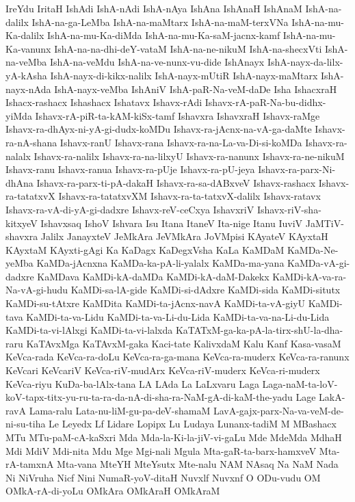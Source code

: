 {IreYdu
IritaH
IshAdi
IshA-nAdi
IshA-nAya
IshAna
IshAnaH
IshAnaM
IshA-na-dalilx
IshA-na-ga-LeMba
IshA-na-maMtarx
IshA-na-maM-terxVNa
IshA-na-mu-Ka-dalilx
IshA-na-mu-Ka-diMda
IshA-na-mu-Ka-saM-jacnx-kamf
IshA-na-mu-Ka-vanunx
IshA-na-na-dhi-deY-vataM
IshA-na-ne-nikuM
IshA-na-shecxVti
IshA-na-veMba
IshA-na-veMdu
IshA-na-ve-nunx-vu-dide
IshAnayx
IshA-nayx-da-lilx-yA-kAsha
IshA-nayx-di-kikx-nalilx
IshA-nayx-mUtiR
IshA-nayx-maMtarx
IshA-nayx-nAda
IshA-nayx-veMba
IshAniV
IshA-paR-Na-veM-daDe
Isha
IshacxraH
Ishacx-rashacx
Ishashacx
Ishatavx
Ishavx-rAdi
Ishavx-rA-paR-Na-bu-didhx-yiMda
Ishavx-rA-piR-ta-kAM-kiSx-tamf
Ishavxra
IshavxraH
Ishavx-raMge
Ishavx-ra-dhAyx-ni-yA-gi-dudx-koMDu
Ishavx-ra-jAcnx-na-vA-ga-daMte
Ishavx-ra-nA-shana
Ishavx-ranU
Ishavx-rana
Ishavx-ra-na-La-va-Di-si-koMDa
Ishavx-ra-nalalx
Ishavx-ra-nalilx
Ishavx-ra-na-lilxyU
Ishavx-ra-nanunx
Ishavx-ra-ne-nikuM
Ishavx-ranu
Ishavx-ranua
Ishavx-ra-pUje
Ishavx-ra-pU-jeya
Ishavx-ra-parx-Ni-dhAna
Ishavx-ra-parx-ti-pA-dakaH
Ishavx-ra-sa-dABxveV
Ishavx-rashacx
Ishavx-ra-tatatxvX
Ishavx-ra-tatatxvXM
Ishavx-ra-ta-tatxvX-dalilx
Ishavx-ratavx
Ishavx-ra-vA-di-yA-gi-dadxre
Ishavx-reV-ceCxya
IshavxriV
Ishavx-riV-sha-kitxyeV
Ishavxsaq
IshoV
Ishvara
Isu
Itana
ItaneV
Ita-nige
Itanu
IuviV
JaMTiV-shavxra
Jalilx
JanayxteV
JeMkAra
JeVMkAra
JoVMpisi
KAyateV
KAyxtaH
KAyxtaM
KAyxti-gAgi
Ka
KaDagx
KaDegxVsha
KaLa
KaMDaM
KaMDa-Ne-yeMba
KaMDa-jAcnxna
KaMDa-ka-pA-li-yalalx
KaMDa-ma-yana
KaMDa-vA-gi-dadxre
KaMDava
KaMDi-kA-daMDa
KaMDi-kA-daM-Dakekx
KaMDi-kA-va-ra-Na-vA-gi-hudu
KaMDi-sa-lA-gide
KaMDi-si-dAdxre
KaMDi-sida
KaMDi-situtx
KaMDi-su-tAtxre
KaMDita
KaMDi-ta-jAcnx-navA
KaMDi-ta-vA-giyU
KaMDi-tava
KaMDi-ta-va-Lidu
KaMDi-ta-va-Li-du-Lida
KaMDi-ta-va-na-Li-du-Lida
KaMDi-ta-vi-lAlxgi
KaMDi-ta-vi-lalxda
KaTATxM-ga-ka-pA-la-tirx-shU-la-dha-raru
KaTAvxMga
KaTAvxM-gaka
Kaci-tate
KalivxdaM
Kalu
Kanf
Kasa-vasaM
KeVca-rada
KeVca-ra-doLu
KeVca-ra-ga-mana
KeVca-ra-muderx
KeVca-ra-ranunx
KeVcari
KeVcariV
KeVca-riV-mudArx
KeVca-riV-muderx
KeVca-ri-muderx
KeVca-riyu
KuDa-ba-lAlx-tana
LA
LAda
La
LaLxvaru
Laga
Laga-naM-ta-loV-koV-tapx-titx-yu-ru-ta-ra-da-nA-di-sha-ra-NaM-gA-di-kaM-the-yadu
Lage
LakA-ravA
Lama-ralu
Lata-nu-liM-gu-pa-deV-shamaM
LavA-gajx-parx-Na-va-veM-de-ni-su-tiha
Le
Leyedx
Lf
Lidare
Lopipx
Lu
Ludaya
Lunanx-tadiM
M
MBashacx
MTu
MTu-paM-cA-kaSxri
Mda
Mda-la-Ki-la-jiV-vi-gaLu
Mde
MdeMda
MdhaH
Mdi
MdiV
Mdi-nita
Mdu
Mge
Mgi-nali
Mgula
Mta-gaR-ta-barx-hamxveV
Mta-rA-tamxnA
Mta-vana
MteYH
MteYsutx
Mte-nalu
NAM
NAsaq
Na
NaM
Nada
Ni
NiVruha
Nicf
Nini
NumaR-yoV-ditaH
Nuvxlf
Nuvxnf
O
ODu-vudu
OM
OMkA-rA-di-yoLu
OMkAra
OMkAraH
OMkAraM
}
